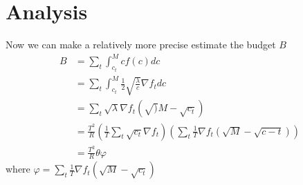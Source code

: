 \documentclass{article}
\begin{document}
\section{Analysis}
Now we can make a relatively more precise estimate the budget $B$
\begin{align}
B&=\sum_t\int_{c_t}^Mcf(c)dc\\
&=\sum_t\int_{c_t}^M\frac{1}{2}\sqrt{\frac{\lambda}{c}}\nabla f_t dc\\
&=\sum_t\sqrt{\lambda}\nabla f_t(\sqrt){M}-\sqrt{c_t})\\
&=\frac{T^2}{R}(\frac{1}{T}\sum_t\sqrt{c_t}\nabla f_t)(\sum_t \frac{1}{T}\nabla f_t(\sqrt{M}-\sqrt{c-t}))\\
&=\frac{T^2}{R}\theta\varphi
\end{align}
where $\varphi=\sum_t\frac{1}{T}\nabla f_t(\sqrt{M}-\sqrt{c_t})$
\end{document}
